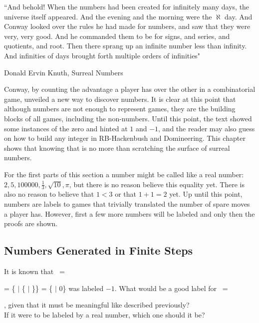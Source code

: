 \epigraph{``And behold! When the numbers had been created for infinitely many days, the universe itself appeared. And the evening and the morning were the $\aleph$ day. And Conway looked over the rules he had made for numbers, and saw that they were very, very good. And he commanded them to be for signs, and series, and quotients, and root. Then there sprang up an infinite number less than infinity. And infinities of days brought forth multiple orders of infinities"}{Donald Ervin Knuth, Surreal Numbers \footnotemark}



Conway, by counting the advantage a player has over the other in a combinatorial game, unveiled a new way to discover numbers. It is clear at this point that although numbers are not enough to represent games, they are the building blocks of all games, including the non-numbers. Until this point, the text showed some instances of the zero and hinted at $1$ and $-1$, and the reader may also guess on how to build any integer in RB-Hackenbush and Domineering. This chapter shows that knowing that is no more than scratching the surface of surreal numbers.

For the first parts of this section a number  might be called like a real number: $2, 5, 100000, \frac{1}{3}, \sqrt{10}, \pi$, but there is no reason believe this equality yet. There is also no reason to believe that $1 < 3$ or that $1 + 1 = 2$ yet. Up until this point, numbers are labels to games that trivially translated the number of spare moves a player has. However, first a few more numbers will be labeled and only then the proofs are shown.


\subsection*{Numbers Generated in Finite Steps}

It is known that \Gm\ =
 = \{ $|$ \{ $|$ \}\} = \{ $|$ 0\} was labeled $-1$.
What would be a good label for \Hm\ = , given that it must be meaningful like described previously?\\ If it were to be labeled by a real number, which one should it be?


